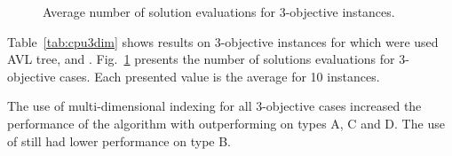 \begin{figure}[H]
  
  \caption{Average number of solution evaluations for 3-objective instances.}
  \label{fig:cmp3dim}
\end{figure}


Table~\ref{tab:cpu3dim} shows results on 3-objective instances for which
were used AVL tree,  and .
Fig.~\ref{fig:cmp3dim} presents the number of solutions evaluations for 3-objective cases.
Each presented value is the average for 10 instances.

The use of multi-dimensional indexing for all 3-objective cases
increased the performance of the algorithm with 
outperforming  on types A, C and D.
The use of \kdtree{} still had lower performance on type B.
